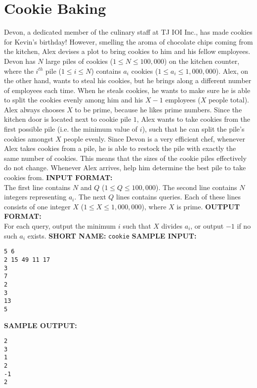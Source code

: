 \section{Cookie Baking}

Devon, a dedicated member of the culinary staff at TJ IOI Inc., has made cookies for Kevin's birthday! However, smelling the aroma of chocolate chips coming from the kitchen, Alex devises a plot to bring cookies to him and his fellow employees.
\blank
Devon has $ N $ large piles of cookies ($ 1 \leq N \leq 100,000 $) on the kitchen counter, where the $i^{th}$ pile ($ 1 \leq i \leq N $) contains $a_i$ cookies ($ 1 \leq a_i \leq 1,000,000 $). Alex, on the other hand, wants to steal his cookies, but he brings along a different number of employees each time.
\blank
When he steals cookies, he wants to make sure he is able to split the cookies evenly among him and his $ X-1 $ employees ($ X $ people total). Alex always chooses $X$ to be prime, because he likes prime numbers. Since the kitchen door is located next to cookie pile $ 1 $, Alex wants to take cookies from the first possible pile (i.e. the minimum value of $i$), such that he can split the pile's cookies amongst $ X $ people evenly.
\blank
Since Devon is a very efficient chef, whenever Alex takes cookies from a pile, he is able to restock the pile with exactly the same number of cookies. This means that the sizes of the cookie piles effectively do not change.
Whenever Alex arrives, help him determine the best pile to take cookies from.
\blank
\textbf{INPUT FORMAT:}\\
The first line contains $ N $ and $Q$ ($1 \leq Q \leq 100,000$).
The second line contains $N$ integers representing $a_i$.
The next $Q$ lines contains queries. Each of these lines consists of one integer $X$ ($1 \leq X \leq 1,000,000$), where $X$ is prime.
\blank
\textbf{OUTPUT FORMAT:}\\
For each query, output the minimum $i$ such that $X$ divides $a_i$, or output $-1$ if no such $ a_i $ exists.
\blank
\textbf{SHORT NAME:} \verb|cookie|
\blank
\textbf{SAMPLE INPUT:}
\begin{verbatim}
5 6
2 15 49 11 17
3
7
2
3
13
5
\end{verbatim}
\textbf{SAMPLE OUTPUT:}
\begin{verbatim}
2
3
1
2
-1
2
\end{verbatim}
